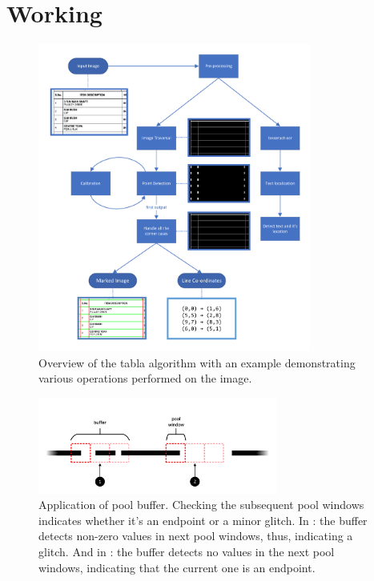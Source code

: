 \documentclass[10pt,journal,compsoc]{IEEEtran}
\newcommand*\circled[2][]{\tikz[baseline=(char.base)]{
    \node[shape=circle,draw,inner sep=2pt,{#1},every number/.try] (char) {\color{white}#2};}}
\begin{document}
\section{Working}
\begin{figure}[!t]
\centering
\includegraphics[width=0.8\textwidth]{figures/overview.pdf}
\caption{Overview of the tabla algorithm with an example demonstrating various operations performed on the image.}
\label{fig:overview}
\end{figure}

\begin{figure}[!t]
\centering
\includegraphics[width=0.7\textwidth]{figures/buffer.pdf}
\caption{Application of pool buffer. Checking the subsequent pool windows indicates whether it's an endpoint or a minor glitch. In \circled[fill=black]{1}: the buffer detects non-zero values in next pool windows, thus, indicating a glitch. And in \circled[fill=black]{2}: the buffer detects no values in the next pool windows, indicating that the current one is an endpoint.}
\label{fig:buffer}
\end{figure}
\end{document}
